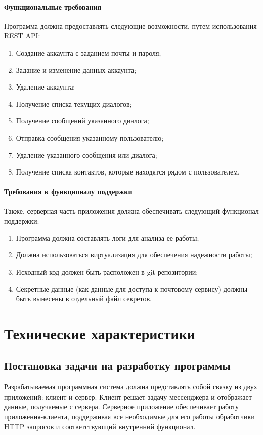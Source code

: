 \documentclass[explnote]{espd}
\begin{document}
\paragraph{Функциональные требования}
Программа должна предоставлять следующие возможности, путем использования REST API:

\begin{enumerate}
\item Создание аккаунта с заданием почты и пароля;
\item Задание и изменение данных аккаунта;
\item Удаление аккаунта;
\item Получение списка текущих диалогов;
\item Получение сообщений указанного диалога;
\item Отправка сообщения указанному пользователю;
\item Удаление указанного сообщения или диалога;
\item Получение списка контактов, которые находятся рядом с пользователем.
\end{enumerate}

\paragraph{Требования к функционалу поддержки}
Также, серверная часть приложения должна обеспечивать следующий функционал поддержки:

\begin{enumerate}
\item Программа должна составлять логи для анализа ее работы;
\item Должна использоваться виртуализация для обеспечения надежности работы;
\item Исходный код должен быть расположен в git-репозитории;
\item Секретные данные (как данные для доступа к почтовому сервису) должны быть вынесены в отдельный файл секретов.
\end{enumerate}

\section{Технические характеристики}
\subsection{Постановка задачи на разработку программы}
Разрабатываемая программная система должна представлять собой связку из двух приложений: клиент и сервер. Клиент решает задачу мессенджера и отображает данные, получаемые с сервера. Серверное приложение обеспечивает работу приложения-клиента, поддерживая все необходимые для его работы обработчики HTTP запросов и соответствующий внутренний функционал. 
\end{document}

